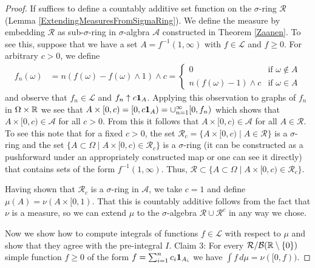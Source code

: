 \documentclass{amsart}
\theoremstyle{remark}
\theoremstyle{definition}
\begin{document}
\begin{proof}
If suffices to define a countably additive set function on the $\sigma$-ring $\mathcal{R}$
(Lemma \ref{ExtendingMeasuresFromSigmaRing}).  We define the measure by embedding $\mathcal{R}$ as
sub-$\sigma$-ring in $\sigma$-algbra $\mathcal{A}$ constructed in
Theorem \ref{Zaanen}.  To see this, suppose that we have a set $A =
f^{-1}(1, \infty)$ with $f \in \mathcal{L}$ and $f \geq 0$.  For arbitrary $c > 0$,
we define
\begin{align*}
f_n(\omega) &= n(f(\omega) - f(\omega) \wedge 1) \wedge c
= \begin{cases}
0 &  \text{if $\omega \notin A$} \\
n(f(\omega) - 1) \wedge c & \text{if $\omega \in A$}
\end{cases}
\end{align*}
and observe that $f_n \in \mathcal{L}$ and $f_n \uparrow c\textbf{1}_{A}$.  Applying this
observation to graphs of $f_n$ in $\Omega \times \mathbb{R}$ we see that
$A \times [0,c) = [0, c\textbf{1}_{A}) = \cup_{n=1}^\infty [0, f_n)$ which shows that $A
\times [0,c) \in \mathcal{A}$ for all $c > 0$.  From this it follows
that $A \times [0,c) \in \mathcal{A}$ for all $A \in \mathcal{R}$.  To
see this note that for a fixed $c >0$, the set $\mathcal{R}_c = \lbrace A \times [0,c)
\mid A \in \mathcal{R} \rbrace$ is a $\sigma$-ring and the set
$\lbrace A \subset \Omega \mid A \times [0,c) \in \mathcal{R}_c
\rbrace$ is a $\sigma$-ring (it can be constructed as a pushforward
under an appropriately constructed map or one can see it directly)
that contains sets of the form $f^{-1}(1, \infty)$.  Thus,
$\mathcal{R} \subset \lbrace A \subset \Omega \mid A \times [0,c) \in \mathcal{R}_c
\rbrace$.

Having shown that $\mathcal{R}_c$ is a $\sigma$-ring in $\mathcal{A}$,
we take $c=1$ and define $\mu(A) = \nu(A \times [0,1)$.  That this
is countably additive follows from the fact that $\nu$ is a measure,
so we can extend $\mu$ to the $\sigma$-algebra $\mathcal{R} \cup
\mathcal{R}^c$ in any way we chose.

Now we show how to compute integrals of functions $f \in \mathcal{L}$
with respect to $\mu$ and show that they agree with the pre-integral
$I$.
Claim 3: For every $\mathcal{R}/\mathcal{B}(\mathbb{R} \setminus \lbrace 0
\rbrace)$ simple function $f \geq 0$ of the form $f = \sum_{i=1}^n c_i
\textbf{1}_{A_i}$ we have $\int f \, d\mu = \nu([0,f))$.


\end{proof}
\end{document}

